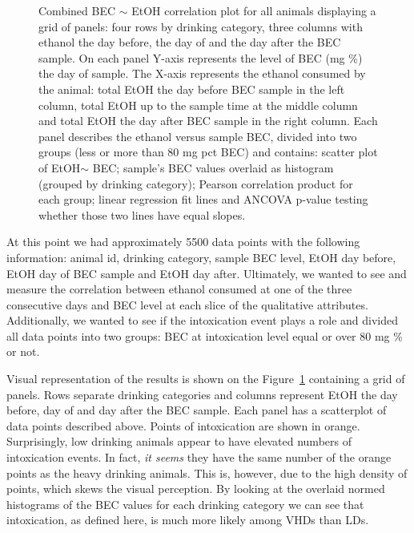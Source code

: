 	\begin{figure}[ht]
		\centering
		\caption{Combined BEC $\sim$ EtOH correlation plot for all animals displaying a grid of panels: four rows by drinking category, three columns with ethanol the day before, the day of and the day after the BEC sample. On each panel Y-axis represents the level of BEC (mg \%) the day of sample. The X-axis represents the ethanol consumed by the animal: total EtOH the day before BEC sample in the left column, total EtOH up to the sample time at the middle column and total EtOH the day after BEC sample in the right column. Each panel describes the ethanol versus sample BEC, divided into two groups (less or more than 80 mg pct BEC) and contains: scatter plot of EtOH$\sim$ BEC; sample's BEC values overlaid as histogram (grouped by drinking category); Pearson correlation product for each group; linear regression fit lines and ANCOVA p-value testing whether those two lines have equal slopes.    }
		\label{fig:bec-over80}
	\end{figure}
	
	At this point we had approximately 5500 data points with the following information: animal id, drinking category, sample BEC level, EtOH day before, EtOH day of BEC sample and EtOH day after. Ultimately, we wanted to see and measure the correlation between ethanol consumed at one of the three consecutive days and BEC level at each slice of the qualitative attributes. Additionally, we wanted to see if the intoxication event plays a role and divided all data points into two groups: BEC at intoxication level equal or over 80 mg \% or not. 
	
	Visual representation of the results is shown on the Figure~\ref{fig:bec-over80} containing a grid of panels. Rows separate drinking categories and columns represent EtOH the day before, day of and day after the BEC sample. Each panel has a scatterplot of data points described above. Points of intoxication are shown in orange. Surprisingly, low drinking animals appear to have elevated numbers of intoxication events. In fact, \textit{it seems} they have the same number of the orange points as the heavy drinking animals. This is, however, due to the high density of points, which skews the visual perception. By looking at the overlaid normed histograms of the BEC values for each drinking category we can see that intoxication, as defined here, is much more likely among VHDs than LDs.   
		
